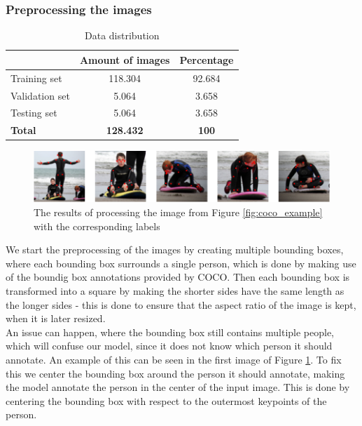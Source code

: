 \documentclass[main.tex]{subfiles}
\begin{document}
\subsubsection{Preprocessing the images}
\begin{table}[H]
    \centering
    \begin{tabular}{l|c|c}
         & Amount of images & Percentage \\
        \hline
        Training set & 118.304 & 92.684 \\
        \hline
        Validation set & 5.064 & 3.658 \\
        \hline
        Testing set & 5.064 & 3.658 \\
        \hline
        \hline
        \textbf{Total} & \textbf{128.432} & \textbf{100} \\
        \hline
    \end{tabular}
    \caption{Data distribution}
    \label{tab:data_distribution}
\end{table}
\begin{figure}[H]
    \centering
    \includegraphics[width = \textwidth - 2 cm]{./entities/crop_img.PNG}
    \caption{The results of processing the image from Figure \ref{fig:coco_example} with the corresponding labels \cite{COCO_article}}
    \label{fig:crop_img}
\end{figure}
We start the preprocessing of the images by creating multiple bounding boxes, where each bounding box surrounds a single person, which is done by making use of the boundig box annotations provided by COCO. Then each bounding box is transformed into a square by making the shorter sides have the same length as the longer sides - this is done to ensure that the aspect ratio of the image is kept, when it is later resized. \\
An issue can happen, where the bounding box still contains multiple people, which will confuse our model, since it does not know which person it should annotate. An example of this can be seen in the first image of Figure \ref{fig:crop_img}. To fix this we center the bounding box around the person it should annotate, making the model annotate the person in the center of the input image. This is done by centering the bounding box with respect to the outermost keypoints of the person. \\
\end{document}
